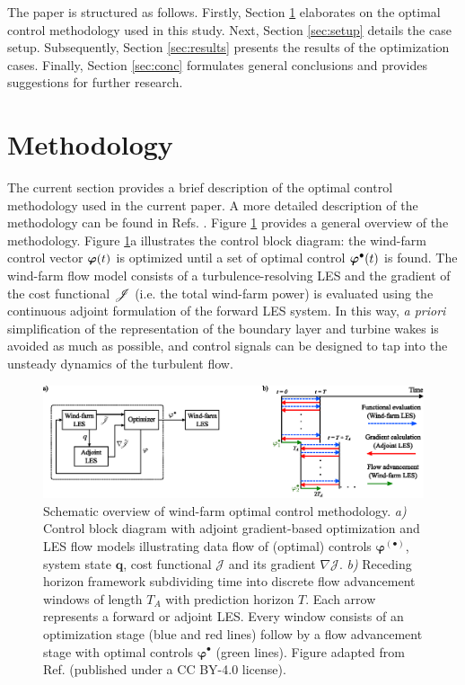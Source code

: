 \documentclass[a4paper]{jpconf}
\begin{document}
The paper is structured as follows. Firstly, Section \ref{sec:meth} elaborates on the optimal control methodology used in this study. Next, Section \ref{sec:setup} details the case setup. Subsequently, Section \ref{sec:results} presents the results of the optimization cases. Finally, Section \ref{sec:conc} formulates general conclusions and provides
suggestions for further research. 

 \section{Methodology} \label{sec:meth}

The current section provides a brief description of the optimal control methodology used in the current paper. A more detailed description of the
methodology can be found in Refs. \cite{goit, munters, muntersenergies}. Figure \ref{fig:meth} provides a general overview of the methodology. Figure
\ref{fig:meth}a illustrates the control block diagram: the wind-farm control vector $\boldsymbol{\varphi}(t)$ is optimized until a set of optimal control
$\boldsymbol{\varphi}^{\bullet}(t)$ is found. The wind-farm flow model consists of a turbulence-resolving LES and the gradient of the 
cost functional $\mathscr{J}$ (i.e. the total wind-farm power) is evaluated using the continuous adjoint formulation of the forward LES system. In this way,
\emph{a priori} simplification of the representation of the boundary layer and turbine wakes is avoided as much as possible, and control signals can
be designed to tap into the unsteady dynamics of the turbulent flow.

\begin{figure}
	\includegraphics[width=\textwidth]{Torque18/figure1}
	\caption{Schematic overview of wind-farm optimal control methodology. \emph{a)} Control block diagram with adjoint gradient-based optimization
	and LES flow models illustrating data flow of (optimal) controls $\boldsymbol{\varphi}^{(\bullet)}$, system state $\boldsymbol{q}$, cost
	functional $\mathscr{J}$ and its gradient $\nabla \mathscr{J}$. \emph{b)} Receding horizon framework subdividing time into discrete flow
	advancement windows of length $T_A$ with prediction horizon $T$. Each arrow represents a forward or adjoint LES. Every window consists of an
	optimization stage (blue and red lines) follow by a flow advancement stage with optimal controls $\boldsymbol{\varphi}^{\bullet}$ (green
	lines). Figure adapted from Ref. \cite{munterswes} (published under a CC BY-4.0 license). \label{fig:meth} }
\end{figure}
\end{document}
